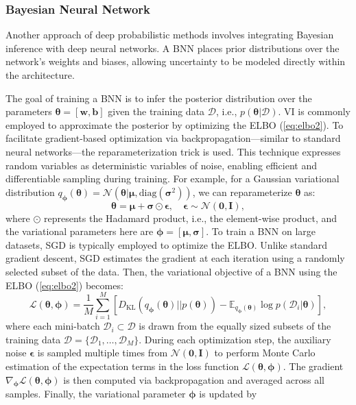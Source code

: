 \subsubsection{Bayesian Neural Network}
Another approach of deep probabilistic methods involves integrating Bayesian inference with deep neural networks. A \acf{BNN} \citep{Neal1996, MacKay1992} places prior distributions over the network’s weights and biases, allowing uncertainty to be modeled directly within the architecture. 

The goal of training a \ac{BNN} is to infer the posterior distribution over the parameters $\boldsymbol{\theta}=[\boldsymbol{w}, \boldsymbol{b}]$ given the training data $\mathcal{D}$, i.e., $p(\boldsymbol{\theta}|\mathcal{D})$. \ac{VI} is commonly employed to approximate the posterior by optimizing the \ac{ELBO} (\ref{eq:elbo2}). 
To facilitate gradient-based optimization via backpropagation---similar to standard neural networks---the reparameterization trick \citep{kingma2013auto} is used. This technique expresses random variables as deterministic variables of noise, enabling efficient and differentiable sampling during training. For example, for a Gaussian variational distribution $q_{\boldsymbol{\phi}}(\boldsymbol{\theta})=\mathcal{N}(\boldsymbol{\theta}|\boldsymbol{\mu}, \text{diag}(\boldsymbol{\sigma}^2))$, we can reparameterize $\boldsymbol{\theta}$ as:  
\begin{equation}
    \boldsymbol{\theta} = \boldsymbol{\mu} + \boldsymbol{\sigma} \odot \boldsymbol{\epsilon}, \quad \boldsymbol{\epsilon}\sim\mathcal{N}(\boldsymbol{0}, \boldsymbol{I}),
\end{equation}  
where $\odot$ represents the Hadamard product, i.e., the element-wise product, and the variational parameters here are $\boldsymbol{\phi}=[\boldsymbol{\mu}, \boldsymbol{\sigma}]$. 
To train a \ac{BNN} on large datasets, \ac{SGD} \citep{bottou1999sgd} is typically employed to optimize the \ac{ELBO}. Unlike standard gradient descent, \ac{SGD} estimates the gradient at each iteration using a randomly selected subset of the data. Then, the variational objective of a \ac{BNN} using the \ac{ELBO} (\ref{eq:elbo2}) becomes:
\begin{equation}
    \mathcal{L}(\boldsymbol{\theta}, \boldsymbol{\phi}) = \frac{1}{M}\sum_{i=1}^{M} [D_{\text{KL}}(q_{\boldsymbol{\phi}}(\boldsymbol{\theta})||p(\boldsymbol{\theta}))-\mathbb{E}_{q_{\boldsymbol{\phi}}(\boldsymbol{\theta})}\log p(\mathcal{D}_i|\boldsymbol{\theta})],
\end{equation}
where each mini-batch $\mathcal{D}_i\subset\mathcal{D}$ is drawn from the equally sized subsets of the training data $\mathcal{D}=\{\mathcal{D}_1,\dots,\mathcal{D}_M\}$. During each optimization step, the auxiliary noise $\boldsymbol{\epsilon}$ is sampled multiple times from $\mathcal{N}(\boldsymbol{0}, \boldsymbol{I})$ to perform Monte Carlo estimation of the expectation terms in the loss function $\mathcal{L}(\boldsymbol{\theta}, \boldsymbol{\phi})$. The gradient $\nabla_{\boldsymbol{\phi}}\mathcal{L}(\boldsymbol{\theta}, \boldsymbol{\phi})$ is then computed via backpropagation and averaged across all samples. Finally, the variational parameter $\boldsymbol{\phi}$ is updated by 

